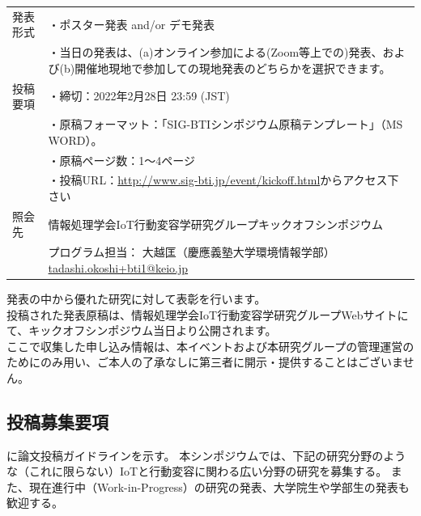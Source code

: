 \documentclass[a4paper,twocolumn,9pt]{jsarticle}
\begin{document}
\begin{table}[t]
    \renewcommand{\thefootnote}{*\alph{footnote}}
    \centering
    \label{tab:submission_guideline}
    \begin{tabular}{l|p{}}\hline\hline
        発表形式\footnotemark[1]
        & ・ポスター発表 and/or デモ発表\\
        & ・当日の発表は、(a)オンライン参加による(Zoom等上での)発表、および(b)開催地現地で参加しての現地発表のどちらかを選択できます。
        \\\hline
        投稿要項\footnotemark[2]\footnotemark[3]
        & ・締切：2022年2月28日 23:59 (JST)\\
        & ・原稿フォーマット：「SIG-BTIシンポジウム原稿テンプレート」（MS WORD）。\\
        & ・原稿ページ数：1〜4ページ\\
        & ・投稿URL：\url{http://www.sig-bti.jp/event/kickoff.html}からアクセス下さい
        \\\hline
        照会先
        & 情報処理学会IoT行動変容学研究グループキックオフシンポジウム\\
        & プログラム担当： 大越匡（慶應義塾大学環境情報学部） \url{tadashi.okoshi+bti1@keio.jp}
        \\\hline
    \end{tabular}
    \begin{flushleft}
        \footnotesize\footnotemark[1]
        発表の中から優れた研究に対して表彰を行います。\\
        \footnotesize\footnotemark[2]
        投稿された発表原稿は、情報処理学会IoT行動変容学研究グループWebサイトにて、キックオフシンポジウム当日より公開されます。\\
        \footnotesize\footnotemark[3]
        ここで収集した申し込み情報は、本イベントおよび本研究グループの管理運営のためにのみ用い、ご本人の了承なしに第三者に開示・提供することはございません。
    \end{flushleft}
\end{table}



\subsection{投稿募集要項}

に論文投稿ガイドラインを示す。
本シンポジウムでは、下記の研究分野のような（これに限らない）IoTと行動変容に関わる広い分野の研究を募集する。
また、現在進行中（Work-in-Progress）の研究の発表、大学院生や学部生の発表も歓迎する。
\end{document}

